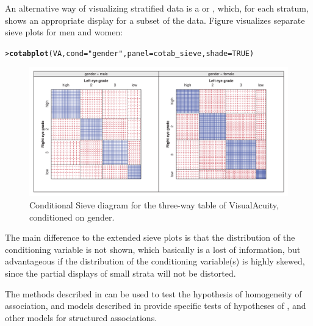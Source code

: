 \documentclass[10pt,krantz2]{krantz}\usepackage[]{graphicx}\usepackage[]{color}
\makeatletter
\newcommand{\hlnum}[1]{\textcolor[rgb]{0.686,0.059,0.569}{#1}}%
\newcommand{\hlstr}[1]{\textcolor[rgb]{0.192,0.494,0.8}{#1}}%
\newcommand{\hlstd}[1]{\textcolor[rgb]{0.345,0.345,0.345}{#1}}%
\newcommand{\hlkwc}[1]{\textcolor[rgb]{0.333,0.667,0.333}{#1}}%
\newcommand{\hlkwd}[1]{\textcolor[rgb]{0.737,0.353,0.396}{\textbf{#1}}}%
\newenvironment{kframe}{%
 \def\at@end@of@kframe{}%
 \ifinner\ifhmode%
  \def\at@end@of@kframe{\end{minipage}}%
  \begin{minipage}{\columnwidth}%
 \fi\fi%
 \def\FrameCommand##1{\hskip\@totalleftmargin \hskip-\fboxsep
 \colorbox{shadecolor}{##1}\hskip-\fboxsep
     \hskip-\linewidth \hskip-\@totalleftmargin \hskip\columnwidth}%
 \MakeFramed {\advance\hsize-\width
   \@totalleftmargin\z@ \linewidth\hsize
   \@setminipage}}%
 {\par\unskip\endMakeFramed%
 \at@end@of@kframe}
\newenvironment{knitrout}{}{} %
\renewenvironment{knitrout}{\small\renewcommand{\baselinestretch}{.85}}{} %
\makeatother
\begin{document}
An alternative way of visualizing stratified data is a 
or , which, for each stratum, shows an
appropriate display for a subset of the data. Figure
 visualizes separate sieve plots for men
and women:
\begin{knitrout}
\color{fgcolor}\begin{kframe}
\begin{alltt}
\hlstd{> }\hlkwd{cotabplot}\hlstd{(VA,} \hlkwc{cond} \hlstd{=} \hlstr{"gender"}\hlstd{,} \hlkwc{panel} \hlstd{= cotab_sieve,} \hlkwc{shade} \hlstd{=} \hlnum{TRUE}\hlstd{)}
\end{alltt}
\end{kframe}\begin{figure}[!htbp]

\centerline{\includegraphics[width=\textwidth]{ch04/fig/VA-cotabsieve3-1} }

\caption[Conditional Sieve diagram for the three-way table of VisualAcuity, conditioned on gender]{Conditional Sieve diagram for the three-way table of VisualAcuity, conditioned on gender.\label{fig:VA-cotabsieve3}}
\end{figure}


\end{knitrout}
\noindent The main difference to the extended sieve plots is that the
distribution of the conditioning variable is not shown, which
basically is a lost of information, but advantageous if the distribution of the conditioning variable(s) is
highly skewed, since the partial displays of small strata will not be distorted.

The methods described in  can be used to test
the hypothesis of homogeneity of association, and
\loglin models described in  provide
specific tests of hypotheses of ,
 and other models for structured associations.
\end{document}
